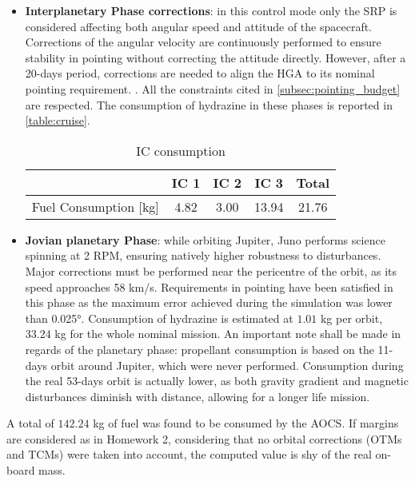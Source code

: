 \begin{itemize}
    \item \textbf{Interplanetary Phase corrections}: in this control mode only the SRP is considered affecting both angular speed and attitude of the spacecraft. Corrections of the angular velocity are continuously performed to ensure stability in pointing without correcting the attitude directly. However, after a 20-days period, corrections are needed to align the HGA to its nominal pointing requirement. \cite{LL_early_cruise}. All the constraints cited in \autoref{subsec:pointing_budget} are respected. 
    The consumption of hydrazine in these phases is reported in \autoref{table:cruise}.

    \vspace*{-2mm}
    \begin{table}[H]
        \renewcommand{\arraystretch}{1.3}
        \centering
        \small
        \begin{tabular}{|c|c|c|c|c|}
            \hline
            &\textbf{IC 1} &\textbf{IC 2} & \textbf{IC 3} &\textbf{Total}\\
            \hline
            \hline
            Fuel Consumption [kg] & 4.82 & 3.00 & 13.94 & 21.76 \\
            \hline
        \end{tabular}
        \caption{IC consumption}
        \label{table:cruise}
    \end{table}
    \vspace*{-4mm}

    \item \textbf{Jovian planetary Phase}: while orbiting Jupiter, Juno performs science spinning at 2 RPM, ensuring natively higher robustness to disturbances. Major corrections must be performed near the pericentre of the orbit, as its speed approaches 58 km/s.  
    Requirements in pointing have been satisfied in this phase as the maximum error achieved during the simulation was lower than 0.025°.  Consumption of hydrazine is estimated at $1.01$ kg per orbit, $33.24$ kg for the whole nominal mission.
    An important note shall be made in regards of the planetary phase: propellant consumption is based on the 11-days orbit around Jupiter, which were never performed. Consumption during the real 53-days orbit is actually lower, as both gravity gradient and magnetic disturbances diminish with distance, allowing for a longer life mission.
\end{itemize}

A total of $142.24$ kg of fuel was found to be consumed by the AOCS. If margins are considered as in Homework 2, considering that no orbital corrections (OTMs and TCMs) were taken into account, the computed value is shy of the real on-board mass.